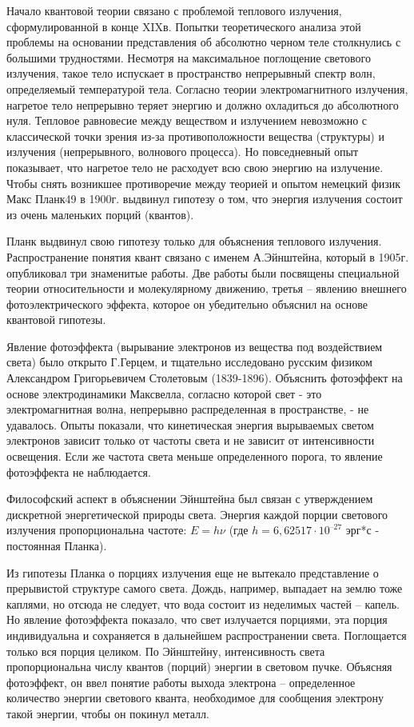 \documentclass[exam_answers.tex]{subfiles}
\begin{document}
\renewcommand{\baselinestretch}{\blch}

Начало квантовой теории связано с проблемой теплового излучения,
сформулированной в конце XIXв. Попытки теоретического анализа этой
проблемы на основании представления об абсолютно черном теле столкнулись
с большими трудностями. Несмотря на максимальное поглощение светового
излучения, такое тело испускает в пространство непрерывный спектр волн,
определяемый температурой тела. Согласно теории электромагнитного
излучения, нагретое тело непрерывно теряет энергию и должно охладиться до
абсолютного нуля. Тепловое равновесие между веществом и излучением
невозможно с классической точки зрения из-за противоположности вещества
(структуры) и излучения (непрерывного, волнового процесса). Но
повседневный опыт показывает, что нагретое тело не расходует всю свою
энергию на излучение. Чтобы снять возникшее противоречие между теорией и
опытом немецкий физик Макс Планк49 в 1900г. выдвинул гипотезу о том, что
энергия излучения состоит из очень маленьких порций (квантов).

Планк выдвинул свою гипотезу только для объяснения теплового
излучения. Распространение понятия квант связано с именем А.Эйнштейна,
который в 1905г. опубликовал три знаменитые работы. Две работы были
посвящены специальной теории относительности и молекулярному движению,
третья – явлению внешнего фотоэлектрического эффекта, которое он
убедительно объяснил на основе квантовой гипотезы.

Явление фотоэффекта (вырывание электронов из вещества под
воздействием света) было открыто Г.Герцем, и тщательно исследовано русским
физиком Александром Григорьевичем Столетовым (1839-1896). Объяснить
фотоэффект на основе электродинамики Максвелла, согласно которой свет - это
электромагнитная волна, непрерывно распределенная в пространстве, - не
удавалось. Опыты показали, что кинетическая энергия вырываемых светом
электронов зависит только от частоты света и не зависит от интенсивности
освещения. Если же частота света меньше определенного порога, то явление
фотоэффекта не наблюдается.

Философский аспект в объяснении Эйнштейна был связан с утверждением
дискретной энергетической природы света. Энергия каждой порции светового
излучения пропорциональна частоте: $E=h\nu$ (где $h = 6,62517\cdot 10^{–27}$ эрг*с -
постоянная Планка).

Из гипотезы Планка о порциях излучения еще не вытекало представление
о прерывистой структуре самого света. Дождь, например, выпадает на землю
тоже каплями, но отсюда не следует, что вода состоит из неделимых частей –
капель. Но явление фотоэффекта показало, что свет излучается порциями, эта
порция индивидуальна и сохраняется в дальнейшем распространении света.
Поглощается только вся порция целиком. По Эйнштейну, интенсивность света
пропорциональна числу квантов (порций) энергии в световом пучке. Объясняя
фотоэффект, он ввел понятие работы выхода электрона – определенное
количество энергии светового кванта, необходимое для сообщения электрону
такой энергии, чтобы он покинул металл.
\end{document}
